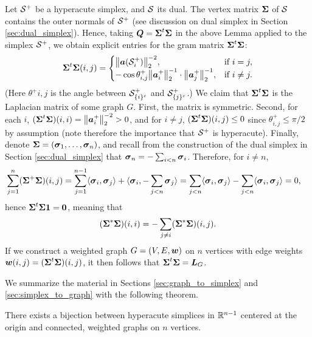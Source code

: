 Let $\mathcal{S}^+$ be a hyperacute simplex, and $\mathcal{S}$ its dual. The vertex matrix $\boldsymbol{\Sigma}$ of $\mathcal{S}$ contains the outer normals of $\mathcal{S}^+$ (see discussion on dual simplex in Section \ref{sec:dual_simplex}). Hence, taking $\vb*{Q}=\boldsymbol{\Sigma}^t \boldsymbol{\Sigma}$ in the above Lemma applied to the simplex $\mathcal{S}^+$, we obtain explicit entries for the gram matrix $\boldsymbol{\Sigma}^t\boldsymbol{\Sigma}$: 
\begin{equation*}
    \boldsymbol{\Sigma}^t \boldsymbol{\Sigma}(i,j) = \begin{cases}
    \norm{\vb*{a}(\mathcal{S}_i^+)}_2^{-2},& \text{if }i=j,\\
-\cos\theta^+_{i,j} \norm{\vb*{a}_i^+}_2^{-1}\cdot \norm{\vb*{a}_j^+}_2^{-1},& \text{if }i\neq j.
    \end{cases}
\end{equation*}
(Here $\theta^+{i,j}$ is the angle between $\mathcal{S}_{\{i\}^c}^+$ and $\mathcal{S}_{\{j\}^c}^+$.)
We claim that $\boldsymbol{\Sigma}^t\boldsymbol{\Sigma}$ is the Laplacian matrix of some graph $G$. First, the matrix is symmetric. Second,
for each $i$, $(\boldsymbol{\Sigma}^t\boldsymbol{\Sigma})(i,i)=\norm{\vb*{a}_i^+}_2^{-2}>0$, and for $i\neq j$, $(\boldsymbol{\Sigma}^t\boldsymbol{\Sigma})(i,j) \leq 0$ since $\theta^+_{i,j}\leq \pi/2$ by assumption (note therefore the importance that $\mathcal{S}^+$ is hyperacute). Finally, denote $\boldsymbol{\Sigma}=(\vb*{\sigma}_1,\dots,\vb*{\sigma}_n)$, and recall from the construction of the dual simplex in Section \ref{sec:dual_simplex} that $\vb*{\sigma}_n=-\sum_{i<n}\vb*{\sigma}_i$. Therefore, for $i\neq n$, 
\begin{align*}
    \sum_{j=1}^n (\boldsymbol{\Sigma}^+\boldsymbol{\Sigma})(i,j) &= \sum_{j=1}^{n-1} \langle \vb*{\sigma}_i,\vb*{\sigma}_j\rangle + \langle \vb*{\sigma}_i,-\sum_{j<n}\vb*{\sigma}_j\rangle = \sum_{j<n}\langle \vb*{\sigma}_i,\vb*{\sigma}_j\rangle - \sum_{j<n}\langle \vb*{\sigma}_i,\vb*{\sigma}_j\rangle  = 0,
\end{align*}
hence $\boldsymbol{\Sigma}^t\boldsymbol{\Sigma}\vb{1}=\vb{0}$, meaning that 
\[(\boldsymbol{\Sigma}^*\boldsymbol{\Sigma})(i,i) = -\sum_{j\neq i}(\boldsymbol{\Sigma}^*\boldsymbol{\Sigma})(i,j).\]
If we construct a weighted graph $G=(V,E,\vb*{w})$ on $n$ vertices with edge weights $\vb*{w}(i,j) = (\boldsymbol{\Sigma}^t\boldsymbol{\Sigma})(i,j)$, it then follows that $\boldsymbol{\Sigma}^t\boldsymbol{\Sigma}=\vb*{L}_G$. 

We summarize the material in Sections \ref{sec:graph_to_simplex} and \ref{sec:simplex_to_graph} with the following theorem. 

\begin{theorem}
	\label{thm:graph-simplex}
	There exists a bijection between hyperacute  simplices in $\mathbb{R}^{n-1}$ centered at the origin and connected, weighted graphs on $n$ vertices. 
\end{theorem}


